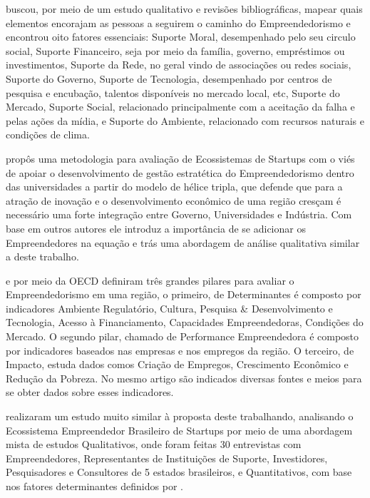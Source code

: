  buscou, por meio de um estudo qualitativo e revisões bibliográficas, mapear quais elementos encorajam as pessoas a seguirem o caminho do Empreendedorismo e encontrou oito fatores essenciais: Suporte Moral, desempenhado pelo seu circulo social, Suporte Financeiro, seja por meio da família, governo, empréstimos ou investimentos, Suporte da Rede, no geral vindo de associações ou redes sociais, Suporte do Governo, Suporte de Tecnologia, desempenhado por centros de pesquisa e encubação, talentos disponíveis no mercado local, etc, Suporte do Mercado, Suporte Social, relacionado principalmente com a aceitação da falha e pelas ações da mídia, e Suporte do Ambiente, relacionado com recursos naturais e condições de clima.

 propôs uma metodologia para avaliação de Ecossistemas de Startups com o viés de apoiar o desenvolvimento de gestão estratética do Empreendedorismo dentro das universidades a partir do modelo de hélice tripla, que defende que para a atração de inovação e o desenvolvimento econômico de uma região cresçam é necessário uma forte integração entre Governo, Universidades e Indústria. Com base em outros autores ele introduz a importância de se adicionar os Empreendedores na equação e trás uma abordagem de análise qualitativa similar a deste trabalho.

 e  por meio da OECD definiram três grandes pilares para avaliar o Empreendedorismo em uma região, o primeiro, de Determinantes é composto por indicadores Ambiente Regulatório, Cultura, Pesquisa \& Desenvolvimento e Tecnologia, Acesso à Financiamento, Capacidades Empreendedoras, Condições do Mercado. O segundo pilar, chamado de Performance Empreendedora é composto por indicadores baseados nas empresas e nos empregos da região. O terceiro, de Impacto, estuda dados comos Criação de Empregos, Crescimento Econômico e Redução da Pobreza. No mesmo artigo são indicados diversas fontes e meios para se obter dados sobre esses indicadores.

 realizaram um estudo muito similar à proposta deste trabalhando, analisando o Ecossistema Empreendedor Brasileiro de Startups por meio de uma abordagem mista de estudos Qualitativos, onde foram feitas 30 entrevistas com Empreendedores, Representantes de Instituições de Suporte, Investidores, Pesquisadores e Consultores de 5 estados brasileiros, e Quantitativos, com base nos fatores determinantes definidos por . 

